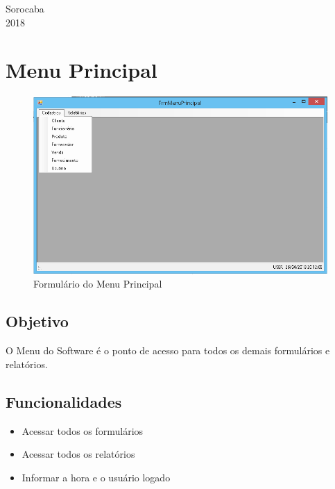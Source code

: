 \documentclass[
	article,			%
	12pt,				%
	oneside,			%
	a4paper,			%
	english,			%
	brazil,				%
	sumario=tradicional
	]{abntex2}
\begin{document}
	
	\frenchspacing
	\begin{folhaderosto}
		\centering
		\maketitle
		\vfill
		{Sorocaba\\2018}
	\end{folhaderosto}
	\newpage
	\tableofcontents
	\newpage
	\section{Menu Principal}
	\begin{figure}[!htb]
		\centering
		\includegraphics[scale=0.7]{../Figuras/FrmMenu.png}
		\caption{Formulário do Menu Principal}
	\end{figure}
	\subsection{Objetivo}
	O Menu do Software é o ponto de acesso para todos os demais formulários e relatórios.
	\subsection{Funcionalidades}
	\begin{itemize}
		\item Acessar todos os formulários
		\item Acessar todos os relatórios
		\item Informar a hora e o usuário logado
    \end{itemize}
\end{document}
